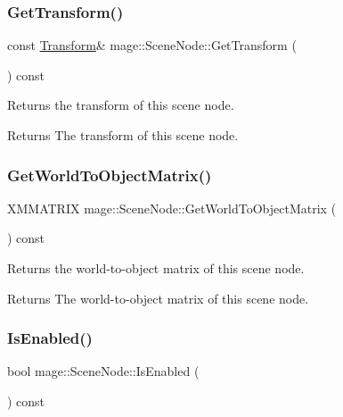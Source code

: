 \subsubsection{\texorpdfstring{Get\+Transform()}{GetTransform()}\hspace{0.1cm}{\footnotesize\ttfamily [2/2]}}
{\footnotesize\ttfamily const \hyperlink{structmage_1_1_transform}{Transform}\& mage\+::\+Scene\+Node\+::\+Get\+Transform (\begin{DoxyParamCaption}{ }\end{DoxyParamCaption}) const}

Returns the transform of this scene node.

\begin{DoxyReturn}{Returns}
The transform of this scene node. 
\end{DoxyReturn}
\hypertarget{classmage_1_1_scene_node_a0ddba0d70a8b2ce0ef80f25673d0dd56}{}\label{classmage_1_1_scene_node_a0ddba0d70a8b2ce0ef80f25673d0dd56} 
\subsubsection{\texorpdfstring{Get\+World\+To\+Object\+Matrix()}{GetWorldToObjectMatrix()}}
{\footnotesize\ttfamily X\+M\+M\+A\+T\+R\+IX mage\+::\+Scene\+Node\+::\+Get\+World\+To\+Object\+Matrix (\begin{DoxyParamCaption}{ }\end{DoxyParamCaption}) const}

Returns the world-\/to-\/object matrix of this scene node.

\begin{DoxyReturn}{Returns}
The world-\/to-\/object matrix of this scene node. 
\end{DoxyReturn}
\hypertarget{classmage_1_1_scene_node_a5e3b2a5d21cb2e17df4ae50344bd6bbc}{}\label{classmage_1_1_scene_node_a5e3b2a5d21cb2e17df4ae50344bd6bbc} 
\subsubsection{\texorpdfstring{Is\+Enabled()}{IsEnabled()}}
{\footnotesize\ttfamily bool mage\+::\+Scene\+Node\+::\+Is\+Enabled (\begin{DoxyParamCaption}{ }\end{DoxyParamCaption}) const}

